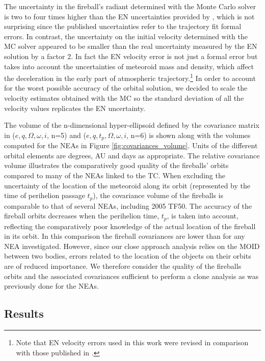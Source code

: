 \documentclass[letters,a4paper,fleqn,usenatbib]{mnras}
\begin{document}
The uncertainty in the fireball's radiant determined with the Monte Carlo solver is two to four times higher than the EN uncertainties provided by \cite{Spurny2017}, which is not surprising since the published uncertainties refer to the trajectory fit formal errors. In contrast, the uncertainty on the initial velocity determined with the MC solver appeared to be smaller than the real uncertainty measured by the EN solution by a factor 2. In fact the EN velocity error is not just a formal error but takes into account the uncertainties of meteoroid mass and density, which affect the deceleration in the early part of atmospheric trajectory.\footnote{Note that EN velocity errors used in this work were revised in comparison with those published in \citet{Spurny2017}.} In order to account for the worst possible accuracy of the orbital solution, we decided to scale the velocity estimates obtained with the MC so the standard deviation of all the velocity values replicates the EN uncertainty.

The volume of the n-dimensional hyper-ellipsoid defined by the covariance matrix in ($e,q,\Omega,\omega,i$, n=5) and ($e,q,t_p,\Omega,\omega,i$, n=6) is shown along with the volumes computed for the NEAs in Figure \ref{fig:covariances_volume}. Units of the different orbital elements are degrees, AU and days as appropriate. The relative covariance volume illustrates the comparatively good quality of the fireballs' orbits compared to many of the NEAs linked to the TC. When excluding the uncertainty of the location of the meteoroid along its orbit (represented by the time of perihelion passage $t_p$), the covariance volume of the fireballs is comparable to that of several NEAs, including 2005 TF50. The accuracy of the fireball orbits decreases when the perihelion time, $t_p$, is taken into account, reflecting the comparatively poor knowledge of the actual location of the fireball in its orbit. In this comparison the fireball covariances are lower than for any NEA investigated. However, since our close approach analysis relies on the MOID between two bodies, errors related to the location of the objects on their orbits are of reduced importance.  We therefore consider the quality of the fireballs orbits and the associated covariances sufficient to perform a clone analysis as was previously done for the NEAs. 
 
 \subsection{Results} \label{sec:fireballs_results} 
\end{document}
